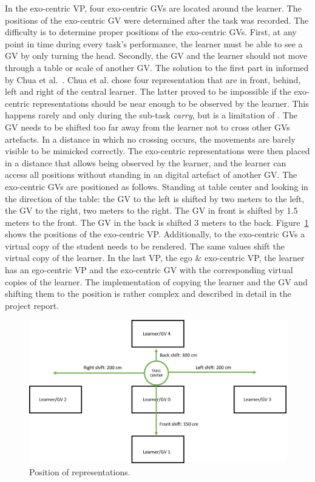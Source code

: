 In the exo-centric VP, four exo-centric GVs are located around the learner. The positions of the exo-centric GV were determined after the task was recorded. The difficulty is to determine proper positions of the exo-centric GVs. First, at any point in time during every task's performance, the learner must be able to see a GV by only turning the head. Secondly, the GV and the learner should not move through a table or scale of another GV. The solution to the first part in informed by Chua et al.~\cite{thaichichua}. Chua et al. chose four representation that are in front, behind, left and right of the central learner. The latter proved to be impossible if the exo-centric representations should be near enough to be observed by the learner. This happens rarely and only during the sub-task \textit{carry}, but is a limitation of \exgo. The GV needs to be shifted too far away from the learner not to cross other GVs artefacts. In a distance in which no crossing occurs, the movements are barely visible to be mimicked correctly. The exo-centric representations were then placed in a distance that allows being observed by the learner, and the learner can access all positions without standing in an digital artefact of another GV. The exo-centric GVs are positioned as follows. Standing at table center and looking in the direction of the table: the GV to the left is shifted by two meters to the left, the GV to the right, two meters to the right. The GV in front is shifted by 1.5 meters to the front. The GV in the back is shifted 3 meters to the back. Figure~\ref{fig:multireppositions} shows the positions of the exo-centric VP. Additionally, to the exo-centric GVs a virtual copy of the student needs to be rendered. The same values shift the virtual copy of the learner. In the last VP, the ego \& exo-centric VP, the learner has an ego-centric VP and the exo-centric GV with the corresponding virtual copies of the learner. The implementation of copying the learner and the GV and shifting them to the position is rather complex and described in detail in the project report.\\
\begin{figure}[htb]
	\centering
	\includegraphics[width=\textwidth]{figures/positions.png}
	\caption[Positions of representations.]{Position of representations.}
	\label{fig:multireppositions}
\end{figure}
